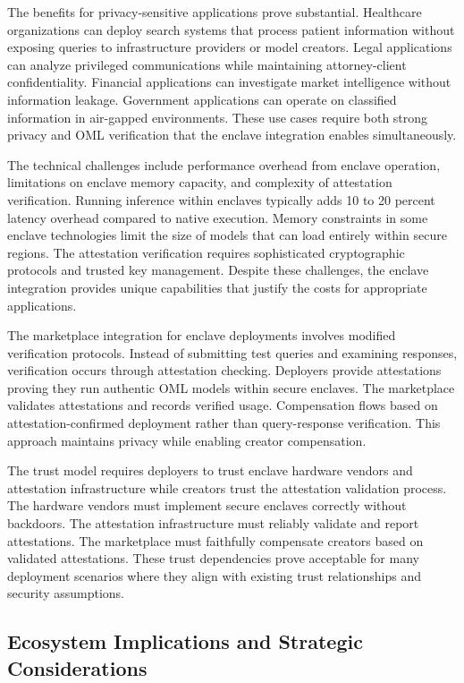The benefits for privacy-sensitive applications prove substantial. Healthcare organizations can deploy search systems that process patient information without exposing queries to infrastructure providers or model creators. Legal applications can analyze privileged communications while maintaining attorney-client confidentiality. Financial applications can investigate market intelligence without information leakage. Government applications can operate on classified information in air-gapped environments. These use cases require both strong privacy and OML verification that the enclave integration enables simultaneously.

The technical challenges include performance overhead from enclave operation, limitations on enclave memory capacity, and complexity of attestation verification. Running inference within enclaves typically adds 10 to 20 percent latency overhead compared to native execution. Memory constraints in some enclave technologies limit the size of models that can load entirely within secure regions. The attestation verification requires sophisticated cryptographic protocols and trusted key management. Despite these challenges, the enclave integration provides unique capabilities that justify the costs for appropriate applications.

The marketplace integration for enclave deployments involves modified verification protocols. Instead of submitting test queries and examining responses, verification occurs through attestation checking. Deployers provide attestations proving they run authentic OML models within secure enclaves. The marketplace validates attestations and records verified usage. Compensation flows based on attestation-confirmed deployment rather than query-response verification. This approach maintains privacy while enabling creator compensation.

The trust model requires deployers to trust enclave hardware vendors and attestation infrastructure while creators trust the attestation validation process. The hardware vendors must implement secure enclaves correctly without backdoors. The attestation infrastructure must reliably validate and report attestations. The marketplace must faithfully compensate creators based on validated attestations. These trust dependencies prove acceptable for many deployment scenarios where they align with existing trust relationships and security assumptions.

\subsection{Ecosystem Implications and Strategic Considerations}

